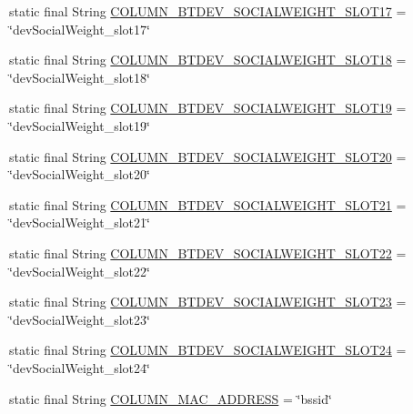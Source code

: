 \begin{DoxyCompactItemize}
\item 
static final String \hyperlink{classcs_1_1usense_1_1db_1_1_usense_s_q_lite_helper_abb6f810d1b4016605521c6a5acb3cec3}{C\+O\+L\+U\+M\+N\+\_\+\+B\+T\+D\+E\+V\+\_\+\+S\+O\+C\+I\+A\+L\+W\+E\+I\+G\+H\+T\+\_\+\+S\+L\+O\+T17} = \char`\"{}dev\+Social\+Weight\+\_\+slot17\char`\"{}
\item 
static final String \hyperlink{classcs_1_1usense_1_1db_1_1_usense_s_q_lite_helper_ab59cabc7e595274cc8f4e98b35ba4ab2}{C\+O\+L\+U\+M\+N\+\_\+\+B\+T\+D\+E\+V\+\_\+\+S\+O\+C\+I\+A\+L\+W\+E\+I\+G\+H\+T\+\_\+\+S\+L\+O\+T18} = \char`\"{}dev\+Social\+Weight\+\_\+slot18\char`\"{}
\item 
static final String \hyperlink{classcs_1_1usense_1_1db_1_1_usense_s_q_lite_helper_a8ed2a853aa7c46a291ca271740b84892}{C\+O\+L\+U\+M\+N\+\_\+\+B\+T\+D\+E\+V\+\_\+\+S\+O\+C\+I\+A\+L\+W\+E\+I\+G\+H\+T\+\_\+\+S\+L\+O\+T19} = \char`\"{}dev\+Social\+Weight\+\_\+slot19\char`\"{}
\item 
static final String \hyperlink{classcs_1_1usense_1_1db_1_1_usense_s_q_lite_helper_a0b01ad96c1db0febac3ea788479f0d3d}{C\+O\+L\+U\+M\+N\+\_\+\+B\+T\+D\+E\+V\+\_\+\+S\+O\+C\+I\+A\+L\+W\+E\+I\+G\+H\+T\+\_\+\+S\+L\+O\+T20} = \char`\"{}dev\+Social\+Weight\+\_\+slot20\char`\"{}
\item 
static final String \hyperlink{classcs_1_1usense_1_1db_1_1_usense_s_q_lite_helper_a8033f240e2d8afd84cdf3b954b0cb7f4}{C\+O\+L\+U\+M\+N\+\_\+\+B\+T\+D\+E\+V\+\_\+\+S\+O\+C\+I\+A\+L\+W\+E\+I\+G\+H\+T\+\_\+\+S\+L\+O\+T21} = \char`\"{}dev\+Social\+Weight\+\_\+slot21\char`\"{}
\item 
static final String \hyperlink{classcs_1_1usense_1_1db_1_1_usense_s_q_lite_helper_a6574e7eb0f59324991c3258a8525aee2}{C\+O\+L\+U\+M\+N\+\_\+\+B\+T\+D\+E\+V\+\_\+\+S\+O\+C\+I\+A\+L\+W\+E\+I\+G\+H\+T\+\_\+\+S\+L\+O\+T22} = \char`\"{}dev\+Social\+Weight\+\_\+slot22\char`\"{}
\item 
static final String \hyperlink{classcs_1_1usense_1_1db_1_1_usense_s_q_lite_helper_a181485a05b93e0ba6d9f57ae732f40b9}{C\+O\+L\+U\+M\+N\+\_\+\+B\+T\+D\+E\+V\+\_\+\+S\+O\+C\+I\+A\+L\+W\+E\+I\+G\+H\+T\+\_\+\+S\+L\+O\+T23} = \char`\"{}dev\+Social\+Weight\+\_\+slot23\char`\"{}
\item 
static final String \hyperlink{classcs_1_1usense_1_1db_1_1_usense_s_q_lite_helper_afe65ef5300aa95789b895d5703201f7a}{C\+O\+L\+U\+M\+N\+\_\+\+B\+T\+D\+E\+V\+\_\+\+S\+O\+C\+I\+A\+L\+W\+E\+I\+G\+H\+T\+\_\+\+S\+L\+O\+T24} = \char`\"{}dev\+Social\+Weight\+\_\+slot24\char`\"{}
\item 
static final String \hyperlink{classcs_1_1usense_1_1db_1_1_usense_s_q_lite_helper_ab4a4a2d02c76987c025ff64720b1f097}{C\+O\+L\+U\+M\+N\+\_\+\+M\+A\+C\+\_\+\+A\+D\+D\+R\+E\+S\+S} = \char`\"{}bssid\char`\"{}

\end{DoxyCompactItemize}
